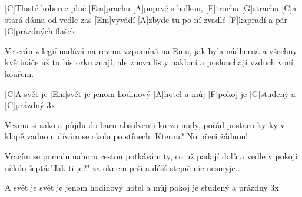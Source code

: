 
[C]Tlusté koberce plné [Em]prachu
[A]poprvé s holkou, [F]trochu [G]strachu
[C]a stará dáma od vedle zas [Em]vyvádí
[A]zbyde tu po ní zvadlé [F]kapradí
a pár [G]prázdných flašek

Veterán z legií nadává na revma
vzpomíná na Emu, jak byla nádherná
a všechny květináče už tu historku znají,
ale znova listy nakloní a poslouchají
vzduch voní kouřem.

[C]A svět je [Em]svět je jenom hodinový [A]hotel
a můj [F]pokoj je [G]studený a [C]prázdný 3x

Vezmu si sako a půjdu do baru
absolventi kurzu nudy, pořád postaru
kytky v klopě vadnou, dívám se okolo po stínech:
Kterou? No přeci žádnou!

Vracím se pomalu nahoru
cestou potkávám ty, co už padají dolů
a vedle v pokoji někdo šeptá:"Jak ti je?"
za oknem prší a déšť stejně nic nesmyje...

A svět je svět je jenom hodinový hotel
a můj pokoj je studený a prázdný 3x
\slpc

